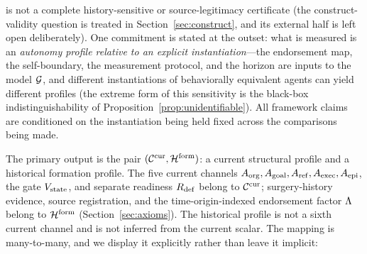 \begin{definition}
is not a complete history-sensitive or source-legitimacy certificate (the
construct-validity question is treated in Section~\ref{sec:construct}, and its
external half is left open deliberately). One commitment is stated at the outset: what is measured
is an \emph{autonomy profile relative to an explicit instantiation}---the
endorsement map, the self-boundary, the measurement protocol, and the horizon
are inputs to the model $\mathcal{G}$, and different instantiations of behaviorally
equivalent agents can yield different profiles (the extreme form of this
sensitivity is the black-box indistinguishability of
Proposition~\ref{prop:unidentifiable}). All framework claims are conditioned
on the instantiation being held fixed across the comparisons being made.
\end{definition}

The primary output is the pair $(\mathcal{C}^{\mathrm{cur}},\mathcal{H}^{\mathrm{form}})$: a current structural profile
and a historical formation profile. The five current channels
$A_{\mathrm{org}},A_{\mathrm{goal}},A_{\mathrm{ref}},A_{\mathrm{exec}},A_{\mathrm{epi}}$, the gate $V_{\mathrm{state}}$, and separate readiness
$R_{\mathrm{def}}$ belong to $\mathcal{C}^{\mathrm{cur}}$; surgery-history evidence, source registration, and
the time-origin-indexed endorsement factor $\Lambda$ belong to $\mathcal{H}^{\mathrm{form}}$
(Section~\ref{sec:axioms}). The historical profile is not a sixth current
channel and is not inferred from the current scalar. The mapping is
many-to-many, and we display it explicitly rather than leave it implicit:

